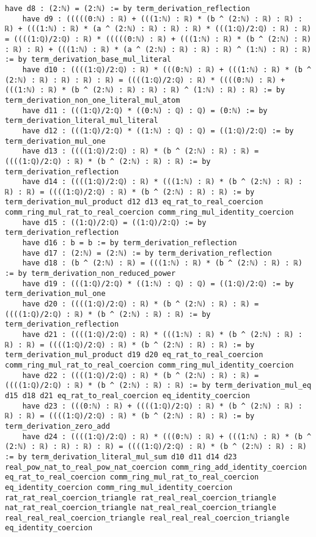 \documentclass{article}
\begin{document}
\begin{tcolorbox}[colback=white!10, width=\linewidth]
\begin{lstlisting}[language=Lean4]
    have d8 : (2:ℕ) = (2:ℕ) := by term_derivation_reflection
    have d9 : (((((0:ℕ) : ℝ) + (((1:ℕ) : ℝ) * (b ^ (2:ℕ) : ℝ) : ℝ) : ℝ) + (((1:ℕ) : ℝ) * (a ^ (2:ℕ) : ℝ) : ℝ) : ℝ) * (((1:ℚ)/2:ℚ) : ℝ) : ℝ) = ((((1:ℚ)/2:ℚ) : ℝ) * (((((0:ℕ) : ℝ) + (((1:ℕ) : ℝ) * (b ^ (2:ℕ) : ℝ) : ℝ) : ℝ) + (((1:ℕ) : ℝ) * (a ^ (2:ℕ) : ℝ) : ℝ) : ℝ) ^ (1:ℕ) : ℝ) : ℝ) := by term_derivation_base_mul_literal
    have d10 : ((((1:ℚ)/2:ℚ) : ℝ) * (((0:ℕ) : ℝ) + (((1:ℕ) : ℝ) * (b ^ (2:ℕ) : ℝ) : ℝ) : ℝ) : ℝ) = ((((1:ℚ)/2:ℚ) : ℝ) * ((((0:ℕ) : ℝ) + (((1:ℕ) : ℝ) * (b ^ (2:ℕ) : ℝ) : ℝ) : ℝ) ^ (1:ℕ) : ℝ) : ℝ) := by term_derivation_non_one_literal_mul_atom
    have d11 : (((1:ℚ)/2:ℚ) * ((0:ℕ) : ℚ) : ℚ) = (0:ℕ) := by term_derivation_literal_mul_literal
    have d12 : (((1:ℚ)/2:ℚ) * ((1:ℕ) : ℚ) : ℚ) = ((1:ℚ)/2:ℚ) := by term_derivation_mul_one
    have d13 : ((((1:ℚ)/2:ℚ) : ℝ) * (b ^ (2:ℕ) : ℝ) : ℝ) = ((((1:ℚ)/2:ℚ) : ℝ) * (b ^ (2:ℕ) : ℝ) : ℝ) := by term_derivation_reflection
    have d14 : ((((1:ℚ)/2:ℚ) : ℝ) * (((1:ℕ) : ℝ) * (b ^ (2:ℕ) : ℝ) : ℝ) : ℝ) = ((((1:ℚ)/2:ℚ) : ℝ) * (b ^ (2:ℕ) : ℝ) : ℝ) := by term_derivation_mul_product d12 d13 eq_rat_to_real_coercion comm_ring_mul_rat_to_real_coercion comm_ring_mul_identity_coercion
    have d15 : ((1:ℚ)/2:ℚ) = ((1:ℚ)/2:ℚ) := by term_derivation_reflection
    have d16 : b = b := by term_derivation_reflection
    have d17 : (2:ℕ) = (2:ℕ) := by term_derivation_reflection
    have d18 : (b ^ (2:ℕ) : ℝ) = (((1:ℕ) : ℝ) * (b ^ (2:ℕ) : ℝ) : ℝ) := by term_derivation_non_reduced_power
    have d19 : (((1:ℚ)/2:ℚ) * ((1:ℕ) : ℚ) : ℚ) = ((1:ℚ)/2:ℚ) := by term_derivation_mul_one
    have d20 : ((((1:ℚ)/2:ℚ) : ℝ) * (b ^ (2:ℕ) : ℝ) : ℝ) = ((((1:ℚ)/2:ℚ) : ℝ) * (b ^ (2:ℕ) : ℝ) : ℝ) := by term_derivation_reflection
    have d21 : ((((1:ℚ)/2:ℚ) : ℝ) * (((1:ℕ) : ℝ) * (b ^ (2:ℕ) : ℝ) : ℝ) : ℝ) = ((((1:ℚ)/2:ℚ) : ℝ) * (b ^ (2:ℕ) : ℝ) : ℝ) := by term_derivation_mul_product d19 d20 eq_rat_to_real_coercion comm_ring_mul_rat_to_real_coercion comm_ring_mul_identity_coercion
    have d22 : ((((1:ℚ)/2:ℚ) : ℝ) * (b ^ (2:ℕ) : ℝ) : ℝ) = ((((1:ℚ)/2:ℚ) : ℝ) * (b ^ (2:ℕ) : ℝ) : ℝ) := by term_derivation_mul_eq d15 d18 d21 eq_rat_to_real_coercion eq_identity_coercion
    have d23 : (((0:ℕ) : ℝ) + ((((1:ℚ)/2:ℚ) : ℝ) * (b ^ (2:ℕ) : ℝ) : ℝ) : ℝ) = ((((1:ℚ)/2:ℚ) : ℝ) * (b ^ (2:ℕ) : ℝ) : ℝ) := by term_derivation_zero_add
    have d24 : ((((1:ℚ)/2:ℚ) : ℝ) * (((0:ℕ) : ℝ) + (((1:ℕ) : ℝ) * (b ^ (2:ℕ) : ℝ) : ℝ) : ℝ) : ℝ) = ((((1:ℚ)/2:ℚ) : ℝ) * (b ^ (2:ℕ) : ℝ) : ℝ) := by term_derivation_literal_mul_sum d10 d11 d14 d23 real_pow_nat_to_real_pow_nat_coercion comm_ring_add_identity_coercion eq_rat_to_real_coercion comm_ring_mul_rat_to_real_coercion eq_identity_coercion comm_ring_mul_identity_coercion rat_rat_real_coercion_triangle rat_real_real_coercion_triangle nat_rat_real_coercion_triangle nat_real_real_coercion_triangle real_real_real_coercion_triangle real_real_real_coercion_triangle eq_identity_coercion

\end{lstlisting}
\end{tcolorbox}
\end{document}

